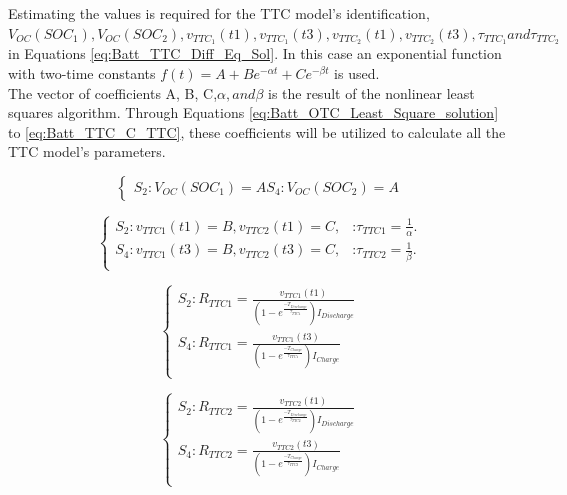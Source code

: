 Estimating the values is required for the TTC model's identification, $V_{OC}(SOC_1), V_{OC}(SOC_2), v_{TTC_1}(t1), v_{TTC_1}(t3), v_{TTC_2}(t1), 
v_{TTC_2}(t3), \tau_{TTC_1}  and  \tau_{TTC_2}$ in Equations \ref{eq:Batt_TTC_Diff_Eq_Sol}. In this 
case an exponential function with two-time constants $f(t)=A+Be^{-\alpha t}+Ce^{- \beta t}$ is used.
\\
The vector of coefficients A, B, C,$\alpha, and \beta$ is the result of the nonlinear least squares algorithm. Through Equations \ref{eq:Batt_OTC_Least_Square_solution} to \ref{eq:Batt_TTC_C_TTC}, these coefficients will be utilized to calculate all the TTC model's parameters. 

\begin{equation}
	\begin{cases}
	  S_2 : V_{OC}(SOC_1) = A 
	  S_4 : V_{OC}(SOC_2) = A
	\end{cases}
\end{equation}

\begin{equation}\label{eq:Batt_OTC_Least_Square_solution}
	\begin{cases}
	  S_2 :  v_{TTC1}(t1) = B, v_{TTC2}(t1) = C ,& \text{:} \tau_{TTC1} = \frac{1}{\alpha}.\\
	  S_4 :  v_{TTC1}(t3) = B, v_{TTC2}(t3) = C ,& \text{:} \tau_{TTC2} = \frac{1}{\beta}.\\
	\end{cases}
\end{equation}

\begin{equation}\label{eq:Batt_TTC_R_TTC1}
	\begin{cases}
	  S_2 : R_{TTC1} = \frac{v_{TTC1}(t1)}{ \left( 1 - e^{\frac{- T_{Discharge} }{\tau_{TTC1} }}\right) I_{Discharge}} \\
	  S_4 : R_{TTC1} = \frac{v_{TTC1}(t3)}{ \left( 1 - e^{\frac{- T_{Charge} }{\tau_{TTC1} }}\right) I_{Charge}} \\
	\end{cases}
\end{equation}

\begin{equation}\label{eq:Batt_TTC_R_TTC2}
	\begin{cases}
	  S_2 : R_{TTC2} = \frac{v_{TTC2}(t1)}{ \left( 1 - e^{\frac{- T_{Discharge} }{\tau_{TTC2} }}\right) I_{Discharge}} \\
	  S_4 : R_{TTC2} = \frac{v_{TTC2}(t3)}{ \left( 1 - e^{\frac{- T_{Charge} }{\tau_{TTC2} }}\right) I_{Charge}} \\
	\end{cases}
\end{equation}

